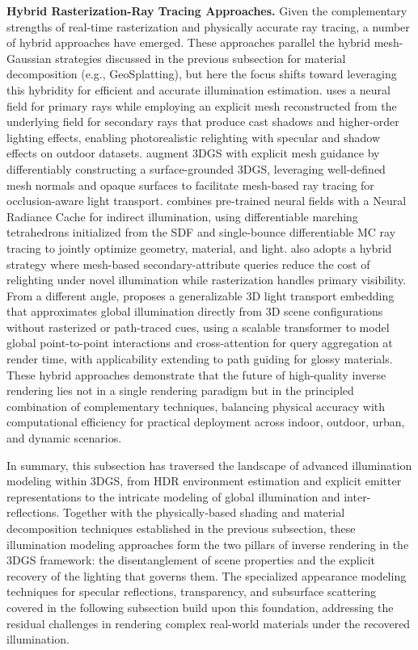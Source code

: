 \documentclass[11pt]{article}
\begin{document}
\textbf{Hybrid Rasterization-Ray Tracing Approaches.} Given the complementary strengths of real-time rasterization and physically accurate ray tracing, a number of hybrid approaches have emerged. These approaches parallel the hybrid mesh-Gaussian strategies discussed in the previous subsection for material decomposition (e.g., GeoSplatting), but here the focus shifts toward leveraging this hybridity for efficient and accurate illumination estimation. \cite{ref595} uses a neural field for primary rays while employing an explicit mesh reconstructed from the underlying field for secondary rays that produce cast shadows and higher-order lighting effects, enabling photorealistic relighting with specular and shadow effects on outdoor datasets. \cite{ref578} augment 3DGS with explicit mesh guidance by differentiably constructing a surface-grounded 3DGS, leveraging well-defined mesh normals and opaque surfaces to facilitate mesh-based ray tracing for occlusion-aware light transport. \cite{ref596} combines pre-trained neural fields with a Neural Radiance Cache for indirect illumination, using differentiable marching tetrahedrons initialized from the SDF and single-bounce differentiable MC ray tracing to jointly optimize geometry, material, and light. \cite{ref575} also adopts a hybrid strategy where mesh-based secondary-attribute queries reduce the cost of relighting under novel illumination while rasterization handles primary visibility. From a different angle, \cite{ref597} proposes a generalizable 3D light transport embedding that approximates global illumination directly from 3D scene configurations without rasterized or path-traced cues, using a scalable transformer to model global point-to-point interactions and cross-attention for query aggregation at render time, with applicability extending to path guiding for glossy materials. These hybrid approaches demonstrate that the future of high-quality inverse rendering lies not in a single rendering paradigm but in the principled combination of complementary techniques, balancing physical accuracy with computational efficiency for practical deployment across indoor, outdoor, urban, and dynamic scenarios.

In summary, this subsection has traversed the landscape of advanced illumination modeling within 3DGS, from HDR environment estimation and explicit emitter representations to the intricate modeling of global illumination and inter-reflections. Together with the physically-based shading and material decomposition techniques established in the previous subsection, these illumination modeling approaches form the two pillars of inverse rendering in the 3DGS framework: the disentanglement of scene properties and the explicit recovery of the lighting that governs them. The specialized appearance modeling techniques for specular reflections, transparency, and subsurface scattering covered in the following subsection build upon this foundation, addressing the residual challenges in rendering complex real-world materials under the recovered illumination.
\end{document}
